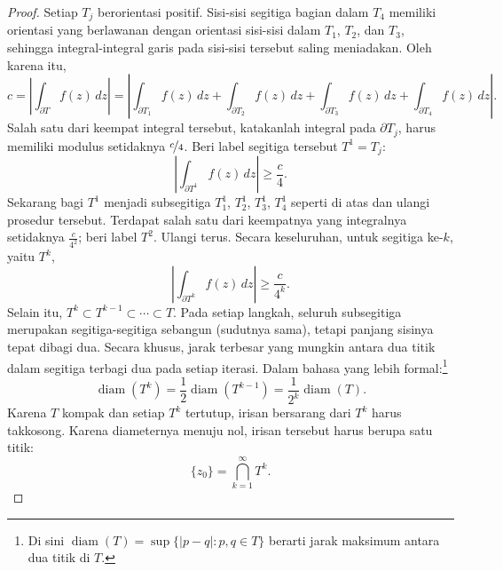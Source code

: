 \documentclass[12pt,openany]{book}
\newcommand{\sabs}[1]{\lvert {#1} \rvert}
\newcommand{\abs}[1]{\left\lvert {#1} \right\rvert}
\theoremstyle{plain}
\theoremstyle{remark}
\theoremstyle{definition}
\theoremstyle{exercise}
\theoremstyle{example}
\begin{document}
\begin{proof}
Setiap $T_j$ berorientasi positif.
Sisi-sisi segitiga bagian dalam $T_4$ memiliki orientasi yang berlawanan
dengan orientasi sisi-sisi dalam $T_1$, $T_2$, dan $T_3$, sehingga
integral-integral garis pada sisi-sisi tersebut saling meniadakan.  Oleh karena itu,
\begin{equation*}
c = 
\abs{\int_{\partial T} f(z) \, dz }
=
\abs{\int_{\partial T_1} f(z) \, dz 
+
\int_{\partial T_2} f(z) \, dz 
+
\int_{\partial T_3} f(z) \, dz 
+
\int_{\partial T_4} f(z) \, dz } .
\end{equation*}
Salah satu dari keempat integral tersebut, katakanlah integral pada $\partial T_j$,
harus memiliki modulus setidaknya $\nicefrac{c}{4}$.  Beri label
segitiga tersebut $T^1 = T_j$:
\begin{equation*}
\abs{\int_{\partial T^1} f(z) \, dz } \geq \frac{c}{4} .
\end{equation*}
Sekarang bagi $T^1$ menjadi subsegitiga
$T_1^1$, $T_2^1$, $T_3^1$, $T_4^1$ seperti di atas dan ulangi prosedur tersebut.  Terdapat
salah satu dari keempatnya yang integralnya setidaknya $\frac{c}{4^2}$; beri label
$T^2$.  Ulangi terus.
Secara keseluruhan, untuk segitiga ke-$k$, yaitu $T^k$,
\begin{equation*}
\abs{\int_{\partial T^k} f(z) \, dz } \geq \frac{c}{4^k} .
\end{equation*}
Selain itu, $T^k \subset T^{k-1} \subset \cdots \subset T$.
Pada setiap langkah, seluruh subsegitiga merupakan segitiga-segitiga sebangun (sudutnya sama),
tetapi panjang sisinya tepat dibagi dua.
Secara khusus,
jarak terbesar yang mungkin antara dua titik dalam segitiga 
terbagi dua pada setiap iterasi.
Dalam bahasa yang lebih formal:\footnote{%
Di sini $\operatorname{diam}(T)= \sup \{ \sabs{p-q} : p,q \in T \}$
berarti jarak maksimum antara dua titik di $T$.}
\begin{equation*}
\operatorname{diam}(T^k) =
\frac{1}{2} \operatorname{diam}(T^{k-1})
=
\frac{1}{2^k} \operatorname{diam}(T) .
\end{equation*}
Karena $T$ kompak dan setiap $T^k$ tertutup, irisan bersarang dari $T^k$ harus takkosong.
Karena diameternya menuju nol, irisan tersebut harus berupa satu titik:
\begin{equation*}
\{ z_0 \} = \bigcap_{k=1}^\infty T^k .
\end{equation*}


\end{proof}
\end{document}
